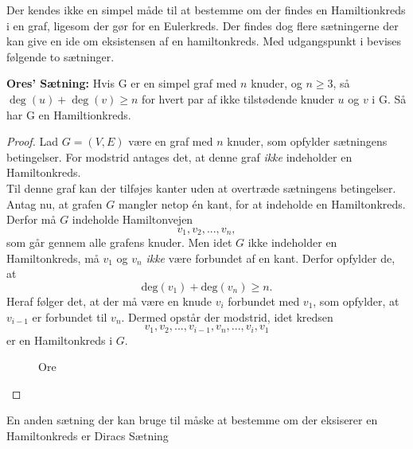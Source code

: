 Der kendes ikke en simpel måde til at bestemme om der findes en Hamiltionkreds i en graf, ligesom der gør for en Eulerkreds. 
Der findes dog flere sætningerne der kan give en ide om eksistensen af en hamiltonkreds. Med udgangspunkt i \cite{wilson_graph} bevises følgende to sætninger.

\begin{thm} \label{ores_thm}
\textbf{Ores' Sætning:} 
Hvis G er en simpel graf med $n$ knuder, og $n\geq3$, så\\ $\deg(u)+\deg(v)\geq n$ for hvert par af ikke tilstødende knuder $u$ og $v$ i G. 
Så har G en Hamiltionkreds. 
\end{thm}

\begin{proof}
Lad $G=(V,E)$ være en graf med $n$ knuder, som opfylder sætningens betingelser. For modstrid antages det, at denne graf \textit{ikke} indeholder en Hamiltonkreds. \\
Til denne graf kan der tilføjes kanter uden at overtræde sætningens betingelser. Antag nu, at grafen $G$ mangler netop én kant, for at indeholde en Hamiltonkreds. 
Derfor må $G$ indeholde Hamiltonvejen 
$$v_1, v_2,...,v_n,$$
som går gennem alle grafens knuder. 
Men idet $G$ ikke indeholder en Hamiltonkreds, må $v_1$ og $v_n$ \textit{ikke} være forbundet af en kant.
Derfor opfylder de, at
$$\textrm{deg}(v_1)+\textrm{deg}(v_n)\geq n.$$
Heraf følger det, at der må være en knude $v_i$ forbundet med $v_1$, som opfylder, at $v_{i-1}$ er forbundet til $v_n$. 
Dermed opstår der modstrid, idet kredsen
$$v_1, v_2,...,v_{i-1},v_n,...,v_i,v_1$$
er en Hamiltonkreds i $G$. 
  
\begin{figure}[h]
\centering
{}
\caption{Ore} 
\label{ore_bevis}
\end{figure}

\end{proof}

En anden sætning der kan bruge til måske at bestemme om der eksiserer en Hamiltonkreds er Diracs Sætning 


